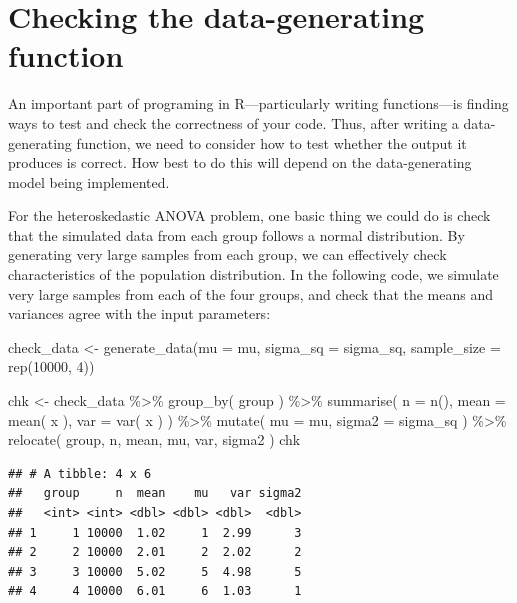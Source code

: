 \documentclass[
]{book}
\newenvironment{Shaded}{\begin{snugshade}}{\end{snugshade}}
\newcommand{\AttributeTok}[1]{\textcolor[rgb]{0.77,0.63,0.00}{#1}}
\newcommand{\DecValTok}[1]{\textcolor[rgb]{0.00,0.00,0.81}{#1}}
\newcommand{\FunctionTok}[1]{\textcolor[rgb]{0.00,0.00,0.00}{#1}}
\newcommand{\NormalTok}[1]{#1}
\newcommand{\OtherTok}[1]{\textcolor[rgb]{0.56,0.35,0.01}{#1}}
\newcommand{\SpecialCharTok}[1]{\textcolor[rgb]{0.00,0.00,0.00}{#1}}
\begin{document}
\hypertarget{checking-the-data-generating-function}{%
\section{Checking the data-generating function}\label{checking-the-data-generating-function}}

An important part of programing in R---particularly writing functions---is finding ways to test and check the correctness of your code. Thus, after writing a data-generating function, we need to consider how to test whether the output it produces is correct. How best to do this will depend on the data-generating model being implemented.

For the heteroskedastic ANOVA problem, one basic thing we could do is check that the simulated data from each group follows a normal distribution. By generating very large samples from each group, we can effectively check characteristics of the population distribution.
In the following code, we simulate very large samples from each of the four groups, and check that the means and variances agree with the input parameters:

\begin{Shaded}
\begin{Highlighting}[]
\NormalTok{check\_data }\OtherTok{\textless{}{-}} \FunctionTok{generate\_data}\NormalTok{(}\AttributeTok{mu =}\NormalTok{ mu, }\AttributeTok{sigma\_sq =}\NormalTok{ sigma\_sq,}
                            \AttributeTok{sample\_size =} \FunctionTok{rep}\NormalTok{(}\DecValTok{10000}\NormalTok{, }\DecValTok{4}\NormalTok{))}

\NormalTok{chk }\OtherTok{\textless{}{-}}\NormalTok{ check\_data }\SpecialCharTok{\%\textgreater{}\%} \FunctionTok{group\_by}\NormalTok{( group ) }\SpecialCharTok{\%\textgreater{}\%}
  \FunctionTok{summarise}\NormalTok{( }\AttributeTok{n =} \FunctionTok{n}\NormalTok{(),}
             \AttributeTok{mean =} \FunctionTok{mean}\NormalTok{( x ),}
             \AttributeTok{var =} \FunctionTok{var}\NormalTok{( x ) ) }\SpecialCharTok{\%\textgreater{}\%}
  \FunctionTok{mutate}\NormalTok{( }\AttributeTok{mu =}\NormalTok{ mu,}
          \AttributeTok{sigma2 =}\NormalTok{ sigma\_sq ) }\SpecialCharTok{\%\textgreater{}\%}
  \FunctionTok{relocate}\NormalTok{( group, n, mean, mu, var, sigma2 )}
\NormalTok{chk}
\end{Highlighting}
\end{Shaded}

\begin{verbatim}
## # A tibble: 4 x 6
##   group     n  mean    mu   var sigma2
##   <int> <int> <dbl> <dbl> <dbl>  <dbl>
## 1     1 10000  1.02     1  2.99      3
## 2     2 10000  2.01     2  2.02      2
## 3     3 10000  5.02     5  4.98      5
## 4     4 10000  6.01     6  1.03      1
\end{verbatim}
\end{document}

